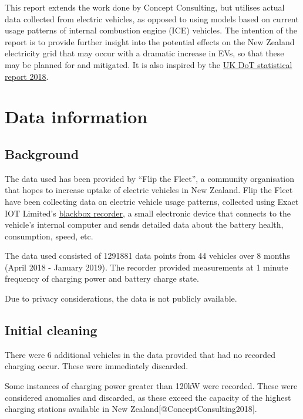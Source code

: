\documentclass[]{article}
\begin{document}
This report extends the work done by Concept Consulting, but utilises
actual data collected from electric vehicles, as opposed to using models
based on current usage patterns of internal combustion engine (ICE)
vehicles. The intention of the report is to provide further insight into
the potential effects on the New Zealand electricity grid that may occur
with a dramatic increase in EVs, so that these may be planned for and
mitigated. It is also inspired by the
\href{https://assets.publishing.service.gov.uk/government/uploads/system/uploads/attachment_data/file/764270/electric-chargepoint-analysis-2017-domestics.pdf}{UK
DoT statistical report 2018}.

\section{Data information}\label{data}

\subsection{Background}\label{background}

The data used has been provided by ``Flip the Fleet'', a community
organisation that hopes to increase uptake of electric vehicles in New
Zealand. Flip the Fleet have been collecting data on electric vehicle
usage patterns, collected using Exact IOT Limited's
\href{https://flipthefleet.org/ev-black-box/}{blackbox recorder}, a
small electronic device that connects to the vehicle's internal computer
and sends detailed data about the battery health, consumption, speed,
etc.

The data used consisted of 1291881 data points from 44 vehicles over 8
months (April 2018 - January 2019). The recorder provided measurements
at 1 minute frequency of charging power and battery charge state.

Due to privacy considerations, the data is not publicly available.

\subsection{Initial cleaning}\label{initial-cleaning}

There were 6 additional vehicles in the data provided that had no
recorded charging occur. These were immediately discarded.

Some instances of charging power greater than 120kW were recorded. These
were considered anomalies and discarded, as these exceed the capacity of
the highest charging stations available in New
Zealand{[}@ConceptConsulting2018{]}.
\end{document}
